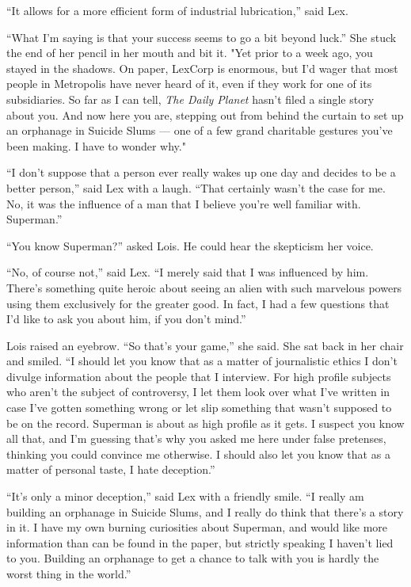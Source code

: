 ``It allows for a more efficient form of industrial lubrication,'' said
Lex.

``What I'm saying is that your success seems to go a bit beyond luck.''
She stuck the end of her pencil in her mouth and bit it. "Yet prior to a
week ago, you stayed in the shadows. On paper, LexCorp is enormous, but
I'd wager that most people in Metropolis have never heard of it, even if
they work for one of its subsidiaries. So far as I can tell, \emph{The
Daily Planet} hasn't filed a single story about you. And now here you
are, stepping out from behind the curtain to set up an orphanage in
Suicide Slums --- one of a few grand charitable gestures you've been
making. I have to wonder why."

``I don't suppose that a person ever really wakes up one day and decides
to be a better person,'' said Lex with a laugh. ``That certainly wasn't
the case for me. No, it was the influence of a man that I believe you're
well familiar with. Superman.''

``You know Superman?'' asked Lois. He could hear the skepticism her
voice.

``No, of course not,'' said Lex. ``I merely said that I was influenced
by him. There's something quite heroic about seeing an alien with such
marvelous powers using them exclusively for the greater good. In fact, I
had a few questions that I'd like to ask you about him, if you don't
mind.''

Lois raised an eyebrow. ``So that's your game,'' she said. She sat back
in her chair and smiled. ``I should let you know that as a matter of
journalistic ethics I don't divulge information about the people that I
interview. For high profile subjects who aren't the subject of
controversy, I let them look over what I've written in case I've gotten
something wrong or let slip something that wasn't supposed to be on the
record. Superman is about as high profile as it gets. I suspect you know
all that, and I'm guessing that's why you asked me here under false
pretenses, thinking you could convince me otherwise. I should also let
you know that as a matter of personal taste, I hate deception.''

``It's only a minor deception,'' said Lex with a friendly smile. ``I
really am building an orphanage in Suicide Slums, and I really do think
that there's a story in it. I have my own burning curiosities about
Superman, and would like more information than can be found in the
paper, but strictly speaking I haven't lied to you. Building an
orphanage to get a chance to talk with you is hardly the worst thing in
the world.''

